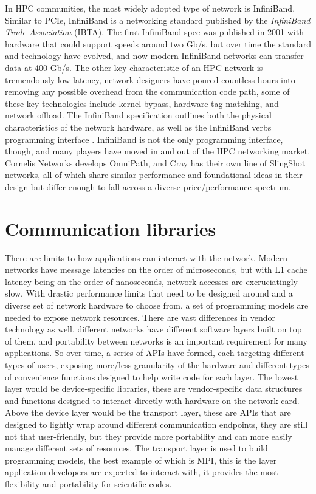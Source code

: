 In HPC communities, the most widely adopted type of network is InfiniBand. 
Similar to PCIe, InfiniBand is a networking standard published by the \textit{InfiniBand Trade Association} (IBTA).
The first InfiniBand spec was published in 2001 with hardware that could support speeds around two Gb/s, but over time the standard and technology have evolved, and now modern InfiniBand networks can transfer data at 400 Gb/s.
The other key characteristic of an HPC network is tremendously low latency, network designers have poured countless hours into removing any possible overhead from the communication code path, some of these key technologies include kernel bypass, hardware tag matching, and network offload.
The InfiniBand specification outlines both the physical characteristics of the network hardware, as well as the InfiniBand verbs programming interface \cite{IBSpec}.
InfiniBand is not the only programming interface, though, and many players have moved in and out of the HPC networking market.
Cornelis Networks develops OmniPath, and Cray has their own line of SlingShot networks, all of which share similar performance and foundational ideas in their design but differ enough to fall across a diverse price/performance spectrum.


\section{Communication libraries} 

There are limits to how applications can interact with the network.
Modern networks have message latencies on the order of microseconds, but with L1 cache latency being on the order of nanoseconds, network accesses are excruciatingly slow.
With drastic performance limits that need to be designed around and a diverse set of network hardware to choose from, a set of programming models are needed to expose network resources. 
There are vast differences in vendor technology as well, different networks have different software layers built on top of them, and portability between networks is an important requirement for many applications. 
So over time, a series of APIs have formed, each targeting different types of users, exposing more/less granularity of the hardware and different types of convenience functions designed to help write code for each layer.
The lowest layer would be device-specific libraries, these are vendor-specific data structures and functions designed to interact directly with hardware on the network card.
Above the device layer would be the transport layer, these are APIs that are designed to lightly wrap around different communication endpoints, they are still not that user-friendly, but they provide more portability and can more easily manage different sets of resources.
The transport layer is used to build programming models, the best example of which is MPI, this is the layer application developers are expected to interact with, it provides the most flexibility and portability for scientific codes.

